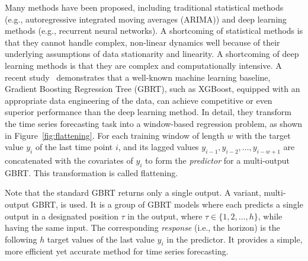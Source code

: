 
Many methods have been proposed, including traditional statistical methods (e.g., autoregressive integrated moving averages (ARIMA)) and deep learning methods (e.g., recurrent neural networks).
A shortcoming of statistical methods is that they cannot handle complex, non-linear dynamics well because of their underlying assumptions of data stationarity and linearity.
A shortcoming of deep learning methods is that they are complex and computationally intensive.
%
A recent study~\cite{elsayed2021we} demonstrates that a well-known machine learning baseline, Gradient Boosting Regression Tree (GBRT), such as XGBoost, equipped with an appropriate data engineering of the data, can achieve competitive or even superior performance than the deep learning method.
In detail, they transform the time series forecasting task into a window-based regression problem, as shown in Figure~\ref{fig:flattening}.
For each training window of length $w$ with the target value \textcolor{tab:red}{$y_i$} of the last time point $i$, and its lagged values \textcolor{tab:red}{$y_{i-1}, y_{i-2}, \dots, y_{i-w+1}$} are concatenated with the covariates of \textcolor{tab:red}{$y_i$} to form the \textit{predictor} for a multi-output GBRT. 
This transformation is called flattening.

Note that the standard GBRT returns only a single output.
A variant, multi-output GBRT, is used.
It is a group of GBRT models where each predicts a single output in a designated position $\tau$ in the output, where $\tau \in \{ 1, 2, \dots, h\}$, while having the same input.
The corresponding \textit{response} (i.e., the horizon) is the following $h$ target values of the last value $y_i$ in the predictor.
It provides a simple, more efficient yet accurate method for time series forecasting.

